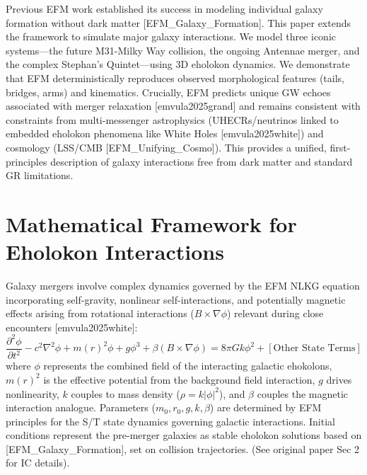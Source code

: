 \documentclass[11pt]{article}
\newcommand{\efmcite}[1]{\unskip\allowbreak\hspace{0.05em plus 0.3em minus 0.05em}[#1]}
\begin{document}
Previous EFM work established its success in modeling individual galaxy formation without dark matter \efmcite{EFM_Galaxy_Formation}. This paper extends the framework to simulate major galaxy interactions. We model three iconic systems—the future M31-Milky Way collision, the ongoing Antennae merger, and the complex Stephan's Quintet—using 3D eholokon dynamics. We demonstrate that EFM deterministically reproduces observed morphological features (tails, bridges, arms) and kinematics. Crucially, EFM predicts unique GW echoes associated with merger relaxation \efmcite{emvula2025grand} and remains consistent with constraints from multi-messenger astrophysics (UHECRs/neutrinos linked to embedded eholokon phenomena like White Holes \efmcite{emvula2025white}) and cosmology (LSS/CMB \efmcite{EFM_Unifying_Cosmo}). This provides a unified, first-principles description of galaxy interactions free from dark matter and standard GR limitations.

\section{Mathematical Framework for Eholokon Interactions}
Galaxy mergers involve complex dynamics governed by the EFM NLKG equation incorporating self-gravity, nonlinear self-interactions, and potentially magnetic effects arising from rotational interactions (\(B \times \nabla \phi\)) relevant during close encounters \efmcite{emvula2025white}:
\begin{equation}
\frac{\partial^2 \phi}{\partial t^2} - c^2 \nabla^2 \phi + m(r)^2 \phi + g \phi^3 + \beta (B \times \nabla \phi) = 8\pi G k \phi^2 + [\text{Other State Terms}]
\label{eq:merger_nlkg}
\end{equation}
where \(\phi\) represents the combined field of the interacting galactic ehokolons, \(m(r)^2\) is the effective potential from the background field interaction, \(g\) drives nonlinearity, \(k\) couples to mass density (\(\rho = k |\phi|^2\)), and \(\beta\) couples the magnetic interaction analogue. Parameters (\(m_0, r_0, g, k, \beta\)) are determined by EFM principles for the S/T state dynamics governing galactic interactions. Initial conditions represent the pre-merger galaxies as stable eholokon solutions based on \efmcite{EFM_Galaxy_Formation}, set on collision trajectories. (See original paper Sec 2 for IC details).
\end{document}
